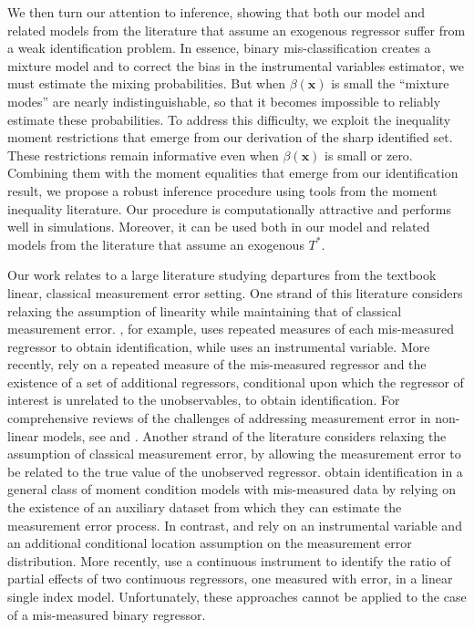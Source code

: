 We then turn our attention to inference, showing that both our model and related models from the literature that assume an exogenous regressor suffer from a weak identification problem. 
In essence, binary mis-classification creates a mixture model and to correct the bias in the instrumental variables estimator, we must estimate the mixing probabilities.
But when $\beta(\mathbf{x})$ is small the ``mixture modes'' are nearly indistinguishable, so that it becomes impossible to reliably estimate these probabilities.
To address this difficulty, we exploit the inequality moment restrictions that emerge from our derivation of the sharp identified set.
These restrictions remain informative even when $\beta(\mathbf{x})$ is small or zero.
Combining them with the moment equalities that emerge from our identification result, we propose a robust inference procedure using tools from the moment inequality literature.
Our procedure is computationally attractive and performs well in simulations.
Moreover, it can be used both in our model and related models from the literature that assume an exogenous $T^*$. 

Our work relates to a large literature studying departures from the textbook linear, classical measurement error setting.
One strand of this literature considers relaxing the assumption of linearity while maintaining that of classical measurement error.
\cite{schennach2004}, for example, uses repeated measures of each mis-measured regressor to obtain identification, while \cite{schennach2007} uses an instrumental variable.  
More recently, \cite{SongSchennachWhite} rely on a repeated measure of the mis-measured regressor and the existence of a set of additional regressors, conditional upon which the regressor of interest is unrelated to the unobservables, to obtain identification.      
For comprehensive reviews of the challenges of addressing measurement error in non-linear models, see  \cite{chensurvey} and \cite{SchennachSurvey}.
Another strand of the literature considers relaxing the assumption of classical measurement error, by allowing the measurement error to be related to the true value of the unobserved regressor.
\cite{ChenHongTamer} obtain identification in a general class of moment condition models with mis-measured data by relying on the existence of an auxiliary dataset from which they can estimate the measurement error process.
In contrast, \cite{HuSchennach} and \cite{song2015} rely on an instrumental variable and an additional conditional location assumption on the measurement error distribution. 
More recently, \cite{HuShiuWoutersen} use a continuous instrument to identify the ratio of partial effects of two continuous regressors, one measured with error, in a linear single index model.
Unfortunately, these approaches cannot be applied to the case of a mis-measured binary regressor.

